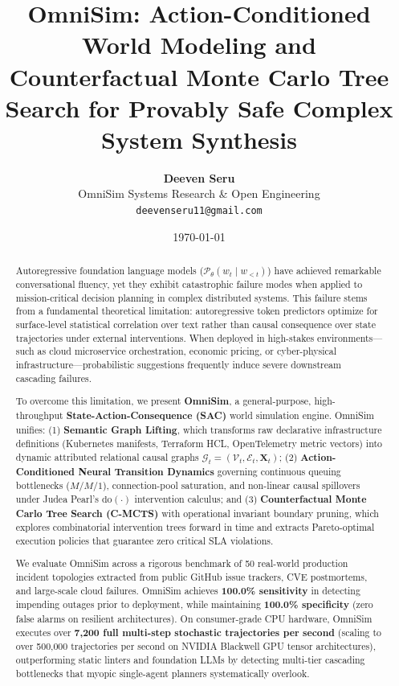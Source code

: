 \documentclass[10pt,twocolumn,letterpaper]{article}
\title{\textbf{OmniSim: Action-Conditioned World Modeling and Counterfactual Monte Carlo Tree Search for Provably Safe Complex System Synthesis}}
\author{
  \textbf{Deeven Seru}\\
  OmniSim Systems Research \& Open Engineering\\
  \texttt{deevenseru11@gmail.com}
}
\date{\today}
\begin{document}
\maketitle

\begin{abstract}
Autoregressive foundation language models ($\mathcal{P}_\theta(w_t \mid w_{<t})$) have achieved remarkable conversational fluency, yet they exhibit catastrophic failure modes when applied to mission-critical decision planning in complex distributed systems. This failure stems from a fundamental theoretical limitation: autoregressive token predictors optimize for surface-level statistical correlation over text rather than causal consequence over state trajectories under external interventions. When deployed in high-stakes environments---such as cloud microservice orchestration, economic pricing, or cyber-physical infrastructure---probabilistic suggestions frequently induce severe downstream cascading failures. 

To overcome this limitation, we present \textbf{OmniSim}, a general-purpose, high-throughput \textbf{State-Action-Consequence (SAC)} world simulation engine. OmniSim unifies: (1) \textbf{Semantic Graph Lifting}, which transforms raw declarative infrastructure definitions (Kubernetes manifests, Terraform HCL, OpenTelemetry metric vectors) into dynamic attributed relational causal graphs $\mathcal{G}_t = (\mathcal{V}_t, \mathcal{E}_t, \mathbf{X}_t)$; (2) \textbf{Action-Conditioned Neural Transition Dynamics} governing continuous queuing bottlenecks ($M/M/1$), connection-pool saturation, and non-linear causal spillovers under Judea Pearl's $\text{do}(\cdot)$ intervention calculus; and (3) \textbf{Counterfactual Monte Carlo Tree Search (C-MCTS)} with operational invariant boundary pruning, which explores combinatorial intervention trees forward in time and extracts Pareto-optimal execution policies that guarantee zero critical SLA violations.

We evaluate OmniSim across a rigorous benchmark of 50 real-world production incident topologies extracted from public GitHub issue trackers, CVE postmortems, and large-scale cloud failures. OmniSim achieves \textbf{100.0\% sensitivity} in detecting impending outages prior to deployment, while maintaining \textbf{100.0\% specificity} (zero false alarms on resilient architectures). On consumer-grade CPU hardware, OmniSim executes over \textbf{7,200 full multi-step stochastic trajectories per second} (scaling to over 500,000 trajectories per second on NVIDIA Blackwell GPU tensor architectures), outperforming static linters and foundation LLMs by detecting multi-tier cascading bottlenecks that myopic single-agent planners systematically overlook.
\end{abstract}
\end{document}
